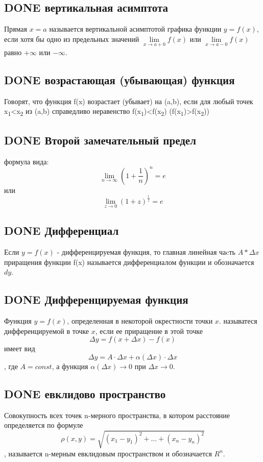 \documentclass[11pt]{article}
\begin{document}
\subsection{{\bfseries\sffamily DONE} вертикальная асимптота}
\label{sec:org19de139}
Прямая \(x=a\) называется вертикальной асимптотой графика функции \(y=f(x)\), если хотя бы одно из предельных значений \(\lim\limits_{x\to a+0}f(x)\) или \(\lim\limits_{x\to a−0}f(x)\) равно \(+\infty\) или \(−\infty\).
\subsection{{\bfseries\sffamily DONE} возрастающая (убывающая) функция}
\label{sec:orga6da5eb}
Говорят, что функция f(x) возрастает (убывает) на (a,b), если для любый точек x\textsubscript{1}<x\textsubscript{2} из (a,b) справедливо неравенство f(x\textsubscript{1})<f(x\textsubscript{2}) (f(x\textsubscript{1})>f(x\textsubscript{2}))
\subsection{{\bfseries\sffamily DONE} Второй замечательный предел}
\label{sec:org61e6cfc}
 формула вида:
$$\lim\limits_{n\to \infty}(1+\frac{1}{n})^n=e$$
или
$$\lim\limits_{z\to 0}(1+z)^{\frac{1}{z}}=e$$

\subsection{{\bfseries\sffamily DONE} Дифференциал}
\label{sec:org6d0eaf9}
Если \(y=f(x)\) - дифференцируемая функция, то главная линейная чаcть \(A*\Delta x\) приращения функции f(x) называется дифференциалом функции и обозначается \(dy\).
\subsection{{\bfseries\sffamily DONE} Дифференцируемая функция}
\label{sec:org9bf0b03}
Функция \(y=f(x)\), определенная в некоторой окрестности точки \(x\). называтеся дифференцируемой в точке \(x\), если ее приращение в этой точке
$$\Delta y=f(x+\Delta x)−f(x)$$
имеет вид
$$\Delta y=A⋅\Delta x+\alpha(\Delta x)⋅\Delta x$$,
где \(A=const\), а функция \(\alpha(\Delta x)\to 0\) при \(\Delta x\to 0\).
\subsection{{\bfseries\sffamily DONE} евклидово пространство}
\label{sec:org9557374}
Совокупность всех точек n-мерного пространства, в котором расстояние определяется по формуле
$$\rho(x,y)=\sqrt{(x_1−y_1)^2+…+(x_n−y_n)^2}$$,
называется n-мерным евклидовым пространством и обозначается \(R^n\).
\end{document}
